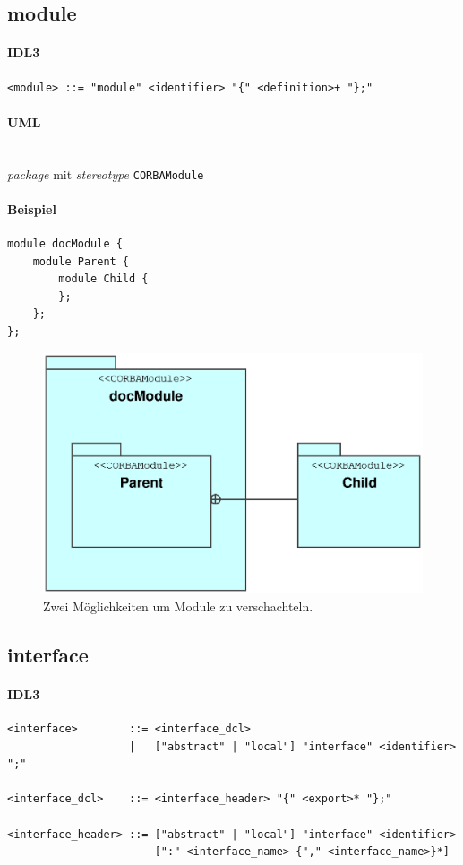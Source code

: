 \documentclass [a4paper,10pt] {scrartcl}
\begin{document}
\cleardoublepage
\subsection{module}
\paragraph{IDL3}
\begin{verbatim}
<module> ::= "module" <identifier> "{" <definition>+ "};"
\end{verbatim}
\paragraph{UML}~\\
\emph{package} mit \emph{stereotype} \texttt{CORBAModule}\\
\paragraph{Beispiel}
\begin{verbatim}
module docModule {
    module Parent {
        module Child {
        };
    };
};
\end{verbatim}
\begin{figure}[!h]
\centerline{\includegraphics[width=\linewidth]{docModule.eps}}
\caption{Zwei M{\"o}glichkeiten um Module zu verschachteln.}
\label{fig:module}
\end{figure}

\cleardoublepage
\subsection{interface}
\label{sec:interface}
\paragraph{IDL3}
\begin{verbatim}
<interface>        ::= <interface_dcl>
                   |   ["abstract" | "local"] "interface" <identifier> ";"

<interface_dcl>    ::= <interface_header> "{" <export>* "};"

<interface_header> ::= ["abstract" | "local"] "interface" <identifier>
                       [":" <interface_name> {"," <interface_name>}*]
\end{verbatim}
\end{document}
